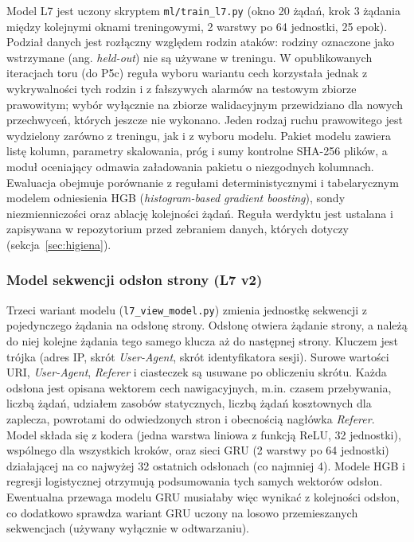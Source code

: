 \documentclass[a4paper,12pt]{article}
\begin{document}
Model L7 jest uczony skryptem \texttt{ml/train\_l7.py} (okno 20 żądań, krok 3 żądania między kolejnymi oknami treningowymi, 2 warstwy po 64 jednostki, 25 epok). Podział danych jest rozłączny względem rodzin ataków: rodziny oznaczone jako wstrzymane (ang. \textit{held-out}) nie są używane w treningu. W opublikowanych iteracjach toru (do P5c) reguła wyboru wariantu cech korzystała jednak z wykrywalności tych rodzin i z fałszywych alarmów na testowym zbiorze prawowitym; wybór wyłącznie na zbiorze walidacyjnym przewidziano dla nowych przechwyceń, których jeszcze nie wykonano. Jeden rodzaj ruchu prawowitego jest wydzielony zarówno z treningu, jak i z wyboru modelu. Pakiet modelu zawiera listę kolumn, parametry skalowania, próg i sumy kontrolne SHA-256 plików, a moduł oceniający odmawia załadowania pakietu o niezgodnych kolumnach. Ewaluacja obejmuje porównanie z regułami deterministycznymi i tabelarycznym modelem odniesienia HGB (\textit{histogram-based gradient boosting}), sondy niezmienniczości oraz ablację kolejności żądań. Reguła werdyktu jest ustalana i zapisywana w repozytorium przed zebraniem danych, których dotyczy (sekcja~\ref{sec:higiena}).

\subsubsection{Model sekwencji odsłon strony (L7 v2)}\label{sec:gru_l7v2}
Trzeci wariant modelu (\texttt{l7\_view\_model.py}) zmienia jednostkę sekwencji z pojedynczego żądania na odsłonę strony. Odsłonę otwiera żądanie strony, a należą do niej kolejne żądania tego samego klucza aż do następnej strony. Kluczem jest trójka (adres IP, skrót \textit{User-Agent}, skrót identyfikatora sesji). Surowe wartości URI, \textit{User-Agent}, \textit{Referer} i ciasteczek są usuwane po obliczeniu skrótu. Każda odsłona jest opisana wektorem cech nawigacyjnych, m.in. czasem przebywania, liczbą żądań, udziałem zasobów statycznych, liczbą żądań kosztownych dla zaplecza, powrotami do odwiedzonych stron i obecnością nagłówka \textit{Referer}. Model składa się z kodera (jedna warstwa liniowa z funkcją ReLU, 32 jednostki), wspólnego dla wszystkich kroków, oraz sieci GRU (2 warstwy po 64 jednostki) działającej na co najwyżej 32 ostatnich odsłonach (co najmniej 4). Modele HGB i regresji logistycznej otrzymują podsumowania tych samych wektorów odsłon. Ewentualna przewaga modelu GRU musiałaby więc wynikać z kolejności odsłon, co dodatkowo sprawdza wariant GRU uczony na losowo przemieszanych sekwencjach (używany wyłącznie w odtwarzaniu).
\end{document}
